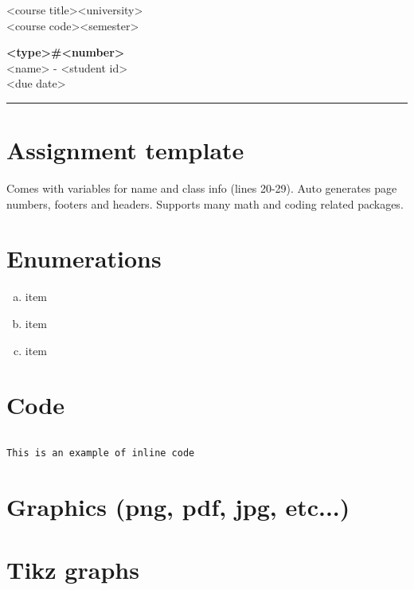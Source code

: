 \documentclass[fleqn, 12pt]{article}
\newcommand{\university}{<university>}
\newcommand{\name}{<name>}
\newcommand{\studentNumber}{<student id>}
\newcommand{\semester}{<semester>}
\newcommand{\assignmentType}{<type>}
\newcommand{\assignemntNumber}{<number>}
\newcommand{\dueDate}{<due date>}
\newcommand{\courseCode}{<course code>}
\newcommand{\courseTitle}{<course title>}
\newcommand{\code}[1]{\colorbox{codegray}{\texttt{#1}}}
\newcommand{\codefile}{\inputminted}
\newcommand{\makeheader}{
    \noindent
    \courseTitle \hfill \university\\
    \courseCode \hfill \semester
    \begin{center}
        \textbf{\assignmentType \#\assignemntNumber}\\
        \name \hspace{1pt} - \studentNumber\\
        \dueDate\\
    \end{center}
    \vspace{6pt}
    \hrule
}
\begin{document}
\thispagestyle{firstpage}
\makeheader

\section*{Assignment template}

Comes with variables for name and class info (lines 20-29). Auto generates page numbers, footers and headers. Supports many math and coding related packages.

\section*{Enumerations}

\begin{enumerate}[a)]
    \item item 
    \item item
    \item item
\end{enumerate}

\section*{Code}

\codefile{javascript}{sample.js}

\code{This is an example of inline code}

\section*{Graphics (png, pdf, jpg, etc...)}


\newpage

\section*{Tikz graphs}
\end{document}
